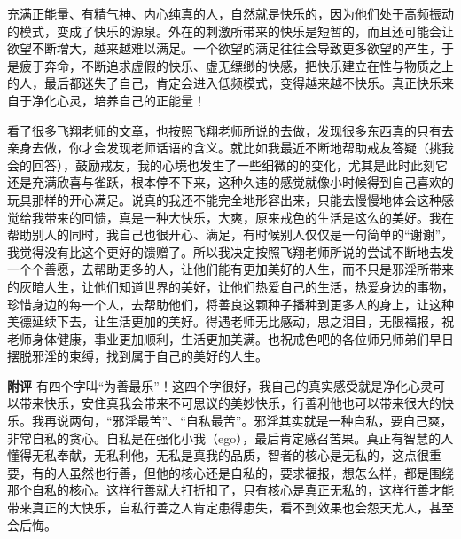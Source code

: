 \begin{case}
    充满正能量、有精气神、内心纯真的人，自然就是快乐的，因为他们处于高频振动的模式，变成了快乐的源泉。外在的刺激所带来的快乐是短暂的，而且还可能会让欲望不断增大，越来越难以满足。一个欲望的满足往往会导致更多欲望的产生，于是疲于奔命，不断追求虚假的快乐、虚无缥缈的快感，把快乐建立在性与物质之上的人，最后都迷失了自己，肯定会进入低频模式，变得越来越不快乐。真正快乐来自于净化心灵，培养自己的正能量！
\end{case}

\begin{case}
    看了很多飞翔老师的文章，也按照飞翔老师所说的去做，发现很多东西真的只有去亲身去做，你才会发现老师话语的含义。就比如我最近不断地帮助戒友答疑（挑我会的回答），鼓励戒友，我的心境也发生了一些细微的的变化，尤其是此时此刻它还是充满欣喜与雀跃，根本停不下来，这种久违的感觉就像小时候得到自己喜欢的玩具那样的开心满足。说真的我还不能完全地形容出来，只能去慢慢地体会这种感觉给我带来的回馈，真是一种大快乐，大爽，原来戒色的生活是这么的美好。我在帮助别人的同时，我自己也很开心、满足，有时候别人仅仅是一句简单的“谢谢”，我觉得没有比这个更好的馈赠了。所以我决定按照飞翔老师所说的尝试不断地去发一个个善愿，去帮助更多的人，让他们能有更加美好的人生，而不只是邪淫所带来的灰暗人生，让他们知道世界的美好，让他们热爱自己的生活，热爱身边的事物，珍惜身边的每一个人，去帮助他们，将善良这颗种子播种到更多人的身上，让这种美德延续下去，让生活更加的美好。得遇老师无比感动，思之泪目，无限福报，祝老师身体健康，事业更加顺利，生活更加美满。也祝戒色吧的各位师兄师弟们早日摆脱邪淫的束缚，找到属于自己的美好的人生。

    \textbf{附评} 有四个字叫“为善最乐”！这四个字很好，我自己的真实感受就是净化心灵可以带来快乐，安住真我会带来不可思议的美妙快乐，行善利他也可以带来很大的快乐。我再说两句，“邪淫最苦”、“自私最苦”。邪淫其实就是一种自私，要自己爽，非常自私的贪心。自私是在强化小我（ego），最后肯定感召苦果。真正有智慧的人懂得无私奉献，无私利他，无私是真我的品质，智者的核心是无私的，这点很重要，有的人虽然也行善，但他的核心还是自私的，要求福报，想怎么样，都是围绕那个自私的核心。这样行善就大打折扣了，只有核心是真正无私的，这样行善才能带来真正的大快乐，自私行善之人肯定患得患失，看不到效果也会怨天尤人，甚至会后悔。


\end{case}
